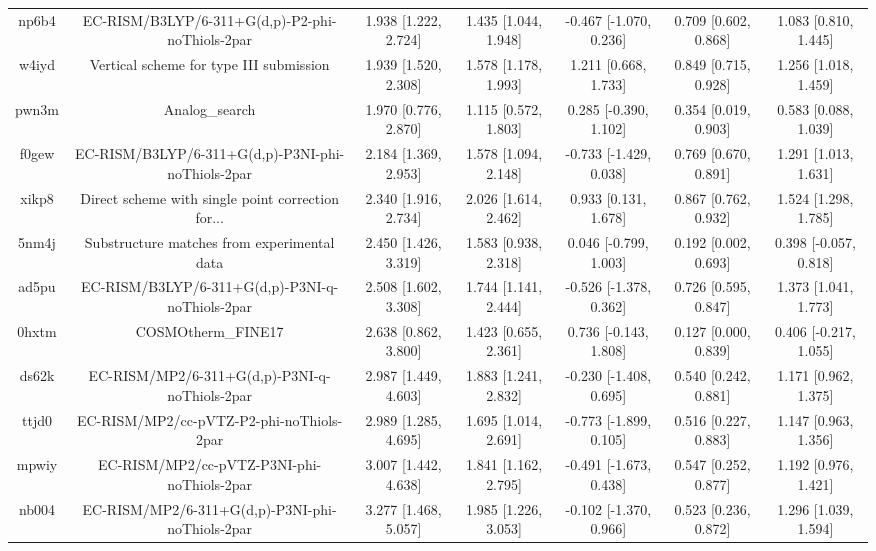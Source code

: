\documentclass{article}
\begin{document}
\begin{center}
\begin{longtable}{|ccccccc|}
 np6b4 &    EC-RISM/B3LYP/6-311+G(d,p)-P2-phi-noThiols-2par &  1.938 [1.222, 2.724] &  1.435 [1.044, 1.948] &   -0.467 [-1.070, 0.236] &  0.709 [0.602, 0.868] &   1.083 [0.810, 1.445] \\
 w4iyd &            Vertical scheme for type III submission &  1.939 [1.520, 2.308] &  1.578 [1.178, 1.993] &     1.211 [0.668, 1.733] &  0.849 [0.715, 0.928] &   1.256 [1.018, 1.459] \\
 pwn3m &                                     Analog\_search &  1.970 [0.776, 2.870] &  1.115 [0.572, 1.803] &    0.285 [-0.390, 1.102] &  0.354 [0.019, 0.903] &   0.583 [0.088, 1.039] \\
 f0gew &  EC-RISM/B3LYP/6-311+G(d,p)-P3NI-phi-noThiols-2par &  2.184 [1.369, 2.953] &  1.578 [1.094, 2.148] &   -0.733 [-1.429, 0.038] &  0.769 [0.670, 0.891] &   1.291 [1.013, 1.631] \\
 xikp8 &  Direct scheme with single point correction for... &  2.340 [1.916, 2.734] &  2.026 [1.614, 2.462] &     0.933 [0.131, 1.678] &  0.867 [0.762, 0.932] &   1.524 [1.298, 1.785] \\
 5nm4j &        Substructure matches from experimental data &  2.450 [1.426, 3.319] &  1.583 [0.938, 2.318] &    0.046 [-0.799, 1.003] &  0.192 [0.002, 0.693] &  0.398 [-0.057, 0.818] \\
 ad5pu &    EC-RISM/B3LYP/6-311+G(d,p)-P3NI-q-noThiols-2par &  2.508 [1.602, 3.308] &  1.744 [1.141, 2.444] &   -0.526 [-1.378, 0.362] &  0.726 [0.595, 0.847] &   1.373 [1.041, 1.773] \\
 0hxtm &                                 COSMOtherm\_FINE17 &  2.638 [0.862, 3.800] &  1.423 [0.655, 2.361] &    0.736 [-0.143, 1.808] &  0.127 [0.000, 0.839] &  0.406 [-0.217, 1.055] \\
 ds62k &      EC-RISM/MP2/6-311+G(d,p)-P3NI-q-noThiols-2par &  2.987 [1.449, 4.603] &  1.883 [1.241, 2.832] &   -0.230 [-1.408, 0.695] &  0.540 [0.242, 0.881] &   1.171 [0.962, 1.375] \\
 ttjd0 &           EC-RISM/MP2/cc-pVTZ-P2-phi-noThiols-2par &  2.989 [1.285, 4.695] &  1.695 [1.014, 2.691] &   -0.773 [-1.899, 0.105] &  0.516 [0.227, 0.883] &   1.147 [0.963, 1.356] \\
 mpwiy &         EC-RISM/MP2/cc-pVTZ-P3NI-phi-noThiols-2par &  3.007 [1.442, 4.638] &  1.841 [1.162, 2.795] &   -0.491 [-1.673, 0.438] &  0.547 [0.252, 0.877] &   1.192 [0.976, 1.421] \\
 nb004 &    EC-RISM/MP2/6-311+G(d,p)-P3NI-phi-noThiols-2par &  3.277 [1.468, 5.057] &  1.985 [1.226, 3.053] &   -0.102 [-1.370, 0.966] &  0.523 [0.236, 0.872] &   1.296 [1.039, 1.594] \\

\end{longtable}
\end{center}
\end{document}
